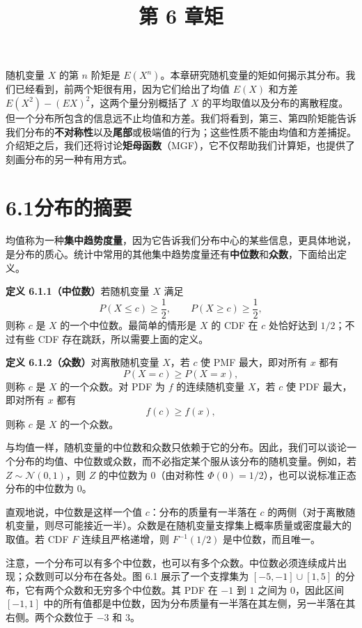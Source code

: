 \documentclass[UTF8, 12pt, fontset=fandol, oneside]{ctexart}
\title{第 6 章\quad 矩}
\author{}
\date{}
\begin{document}
\maketitle

随机变量 $X$ 的第 $n$ 阶矩是 $E(X^n)$。本章研究随机变量的矩如何揭示其分布。我们已经看到，前两个矩很有用，因为它们给出了均值 $E(X)$ 和方差 $E(X^2)-(EX)^2$，这两个量分别概括了 $X$ 的平均取值以及分布的离散程度。但一个分布所包含的信息远不止均值和方差。我们将看到，第三、第四阶矩能告诉我们分布的\textbf{不对称性}以及\textbf{尾部}或极端值的行为；这些性质不能由均值和方差捕捉。介绍矩之后，我们还将讨论\textbf{矩母函数}（MGF），它不仅帮助我们计算矩，也提供了刻画分布的另一种有用方式。

\section*{6.1\quad 分布的摘要}

均值称为一种\textbf{集中趋势度量}，因为它告诉我们分布中心的某些信息，更具体地说，是分布的质心。统计中常用的其他集中趋势度量还有\textbf{中位数}和\textbf{众数}，下面给出定义。

\noindent\textbf{定义 6.1.1（中位数）}\quad 若随机变量 $X$ 满足
\[
  P(X\le c)\ge \frac12,\qquad P(X\ge c)\ge \frac12,
\]
则称 $c$ 是 $X$ 的一个中位数。最简单的情形是 $X$ 的 CDF 在 $c$ 处恰好达到 $1/2$；不过有些 CDF 存在跳跃，所以需要上面的定义。

\noindent\textbf{定义 6.1.2（众数）}\quad 对离散随机变量 $X$，若 $c$ 使 PMF 最大，即对所有 $x$ 都有
\[
  P(X=c)\ge P(X=x),
\]
则称 $c$ 是 $X$ 的一个众数。对 PDF 为 $f$ 的连续随机变量 $X$，若 $c$ 使 PDF 最大，即对所有 $x$ 都有
\[
  f(c)\ge f(x),
\]
则称 $c$ 是 $X$ 的一个众数。

与均值一样，随机变量的中位数和众数只依赖于它的分布。因此，我们可以谈论一个分布的均值、中位数或众数，而不必指定某个服从该分布的随机变量。例如，若 $Z\sim\mathcal{N}(0,1)$，则 $Z$ 的中位数为 $0$（由对称性 $\Phi(0)=1/2$），也可以说标准正态分布的中位数为 $0$。

直观地说，中位数是这样一个值 $c$：分布的质量有一半落在 $c$ 的两侧（对于离散随机变量，则尽可能接近一半）。众数是在随机变量支撑集上概率质量或密度最大的取值。若 CDF $F$ 连续且严格递增，则 $F^{-1}(1/2)$ 是中位数，而且唯一。

注意，一个分布可以有多个中位数，也可以有多个众数。中位数必须连续成片出现；众数则可以分布在各处。图 6.1 展示了一个支撑集为 $[-5,-1]\cup[1,5]$ 的分布，它有两个众数和无穷多个中位数。其 PDF 在 $-1$ 到 $1$ 之间为 $0$，因此区间 $[-1,1]$ 中的所有值都是中位数，因为分布质量有一半落在其左侧，另一半落在其右侧。两个众数位于 $-3$ 和 $3$。
\end{document}

